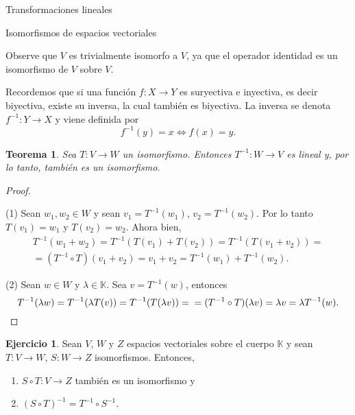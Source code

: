 \documentclass[a4paper,12pt,twoside,spanish,reqno]{amsbook}
\newtheorem{teorema}{Teorema}[section]
\theoremstyle{definition}
\newtheorem{ejercicio}{Ejercicio}[section]
\theoremstyle{remark}
\newcommand{\K}{\mathbb K}
\begin{document}
\begin{chapter}{Transformaciones lineales}
\begin{section}{Isomorfismos de espacios vectoriales}
        
        
        Observe que $V$ es trivialmente isomorfo a $V$, ya que el operador identidad es un isomorfismo de $V$ sobre $V$. 
            
        Recordemos que si una función $f: X \to Y$ es suryectiva e inyectiva, es decir biyectiva, existe su inversa, la cual también es biyectiva. La inversa se denota $f^{-1}: Y \to X$ y viene definida por
        $$
        f^{-1}(y) = x \Leftrightarrow f(x) =y.
        $$ 
        
        \begin{teorema}
            Sea $T:V \to W$ un isomorfismo. Entonces $T^{-1}: W \to V$ es lineal y, por lo tanto, también es un isomorfismo.
        \end{teorema}
        \begin{proof}
            \
            
            (1) Sean $w_1, w_2 \in W$ y sean $v_1 = T^{-1}(w_1) $, $v_2 = T^{-1}(w_2)$. Por lo tanto $T(v_1) = w_1$ y $T(v_2) = w_2$. Ahora bien,
            \begin{multline*}
                T^{-1}(w_1+w_2) = 	T^{-1}(T(v_1)+T(v_2))  = 	T^{-1}(T(v_1+v_2)) = \\ =(T^{-1}\circ T)(v_1+v_2) = v_1+v_2 = T^{-1}(w_1)+ T^{-1}(w_2). 
            \end{multline*}    
            
            (2) Sean $w \in W$ y $\lambda  \in \K$. Sea $v = T^{-1}(w)$, entonces
            \begin{equation*}
            T^{-1}(\lambda w) = 	T^{-1}(\lambda T(v))  = 	T^{-1}(T(\lambda v)) = \\ =(T^{-1}\circ T)(\lambda v) = \lambda v = \lambda  T^{-1}(w). 
            \end{equation*}
                \end{proof}
        
        
        \begin{ejercicio} 
            Sean $V$, $W$ y $Z$ espacios vectoriales sobre el cuerpo $\K$ y sean $T:V \to W$, $S:W \to Z$ isomorfismos. Entonces, 
            \begin{enumerate}
                \item $S\circ T:V \to Z$  también es un isomorfismo y
                \item 	$(S\circ T)^{-1} = T^{-1}\circ S^{-1}$.
            \end{enumerate}
        \end{ejercicio}
        

\end{section}
\end{chapter}
\end{document}
